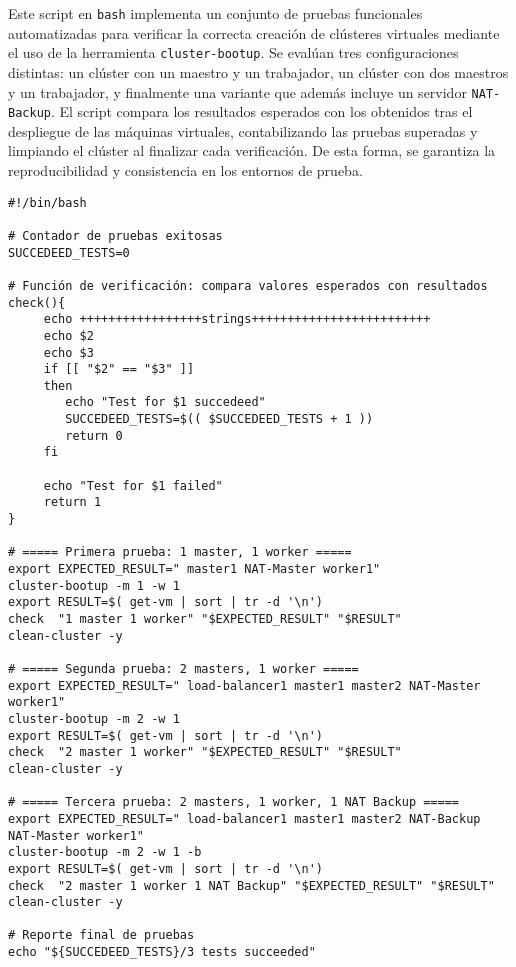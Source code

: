 Este script en \texttt{bash} implementa un conjunto de pruebas funcionales automatizadas para verificar la correcta creación de clústeres virtuales mediante el uso de la herramienta \texttt{cluster-bootup}. Se evalúan tres configuraciones distintas: un clúster con un maestro y un trabajador, un clúster con dos maestros y un trabajador, y finalmente una variante que además incluye un servidor \texttt{NAT-Backup}. El script compara los resultados esperados con los obtenidos tras el despliegue de las máquinas virtuales, contabilizando las pruebas superadas y limpiando el clúster al finalizar cada verificación. De esta forma, se garantiza la reproducibilidad y consistencia en los entornos de prueba.  

\begin{verbatim}
#!/bin/bash

# Contador de pruebas exitosas
SUCCEDEED_TESTS=0

# Función de verificación: compara valores esperados con resultados
check(){
     echo +++++++++++++++++strings+++++++++++++++++++++++++
     echo $2
     echo $3
     if [[ "$2" == "$3" ]]
     then
        echo "Test for $1 succedeed"
        SUCCEDEED_TESTS=$(( $SUCCEDEED_TESTS + 1 ))
        return 0
     fi

     echo "Test for $1 failed"
     return 1
}

# ===== Primera prueba: 1 master, 1 worker =====
export EXPECTED_RESULT=" master1 NAT-Master worker1"
cluster-bootup -m 1 -w 1
export RESULT=$( get-vm | sort | tr -d '\n')
check  "1 master 1 worker" "$EXPECTED_RESULT" "$RESULT"
clean-cluster -y

# ===== Segunda prueba: 2 masters, 1 worker =====
export EXPECTED_RESULT=" load-balancer1 master1 master2 NAT-Master worker1"
cluster-bootup -m 2 -w 1
export RESULT=$( get-vm | sort | tr -d '\n')
check  "2 master 1 worker" "$EXPECTED_RESULT" "$RESULT"
clean-cluster -y

# ===== Tercera prueba: 2 masters, 1 worker, 1 NAT Backup =====
export EXPECTED_RESULT=" load-balancer1 master1 master2 NAT-Backup NAT-Master worker1"
cluster-bootup -m 2 -w 1 -b
export RESULT=$( get-vm | sort | tr -d '\n')
check  "2 master 1 worker 1 NAT Backup" "$EXPECTED_RESULT" "$RESULT"
clean-cluster -y

# Reporte final de pruebas
echo "${SUCCEDEED_TESTS}/3 tests succeeded"
\end{verbatim}